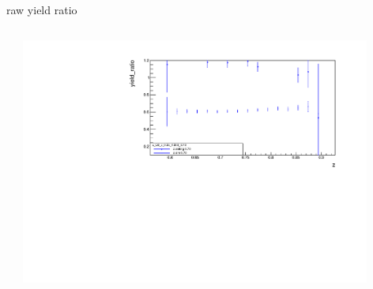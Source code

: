 \begin{frame}{raw yield ratio}
\begin{columns}
\begin{column}[T]{0.5\textwidth}
\end{column}
\begin{column}[T]{0.5\textwidth}
\includegraphics[width = 0.9\textwidth]{results/yield/statistics/x_Q2_z_0.35_4.000_0.70_ratio.pdf}
\end{column}
\end{columns}
\end{frame}
